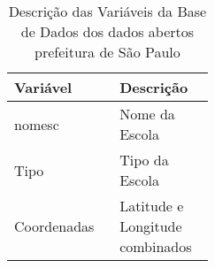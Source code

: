 \begin{table}[H]
    \centering

    
    \begin{tabular}{|m{0.25\linewidth}|m{0.20\linewidth}|}
      \hline
      \textbf{Variável} & \textbf{Descrição}  \\
      \hline
      nomesc & Nome da Escola  \\
      \hline
      Tipo & Tipo da Escola \\
      \hline
      Coordenadas & Latitude e Longitude combinados  \\
      \hline
    \end{tabular}
    \caption{Descrição das Variáveis da Base de Dados dos dados abertos prefeitura de São Paulo}
    \label{tab_variaveis-itbi}
\end{table}


